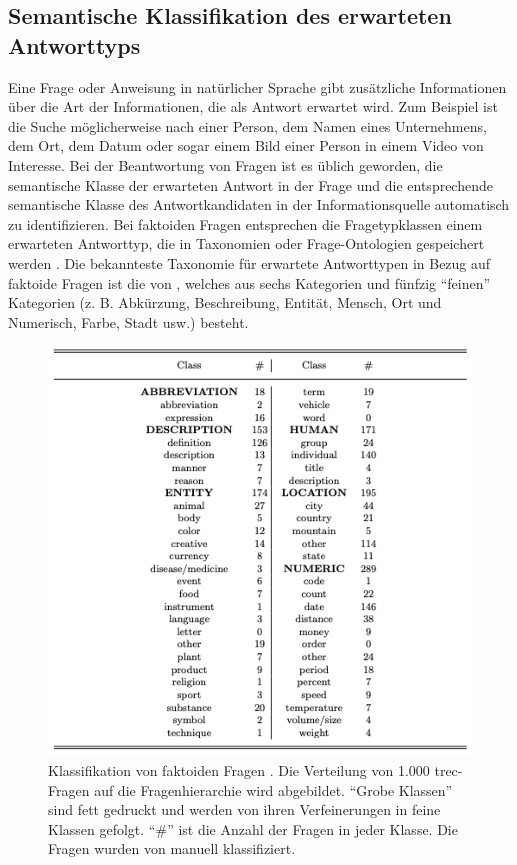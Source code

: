 \documentclass[
        ngerman,
        paper=a4,
        numbers=noendperiod,
]{scrreprt}
\begin{document}
\subsection{Semantische Klassifikation des erwarteten Antworttyps}

Eine Frage oder Anweisung in natürlicher Sprache gibt zusätzliche Informationen über die Art der Informationen, die als Antwort erwartet wird. Zum Beispiel ist die Suche möglicherweise nach einer Person, dem Namen eines Unternehmens, dem Ort, dem Datum oder sogar einem Bild einer Person in einem Video von Interesse. Bei der Beantwortung von Fragen ist es üblich geworden, die semantische Klasse der erwarteten Antwort in der Frage und die entsprechende semantische Klasse des Antwortkandidaten in der Informationsquelle automatisch zu identifizieren. Bei faktoiden Fragen entsprechen die Fragetypklassen einem erwarteten Antworttyp, die in Taxonomien oder Frage-Ontologien gespeichert werden \citep[S. 5420]{Kolomiyets2011APerspective}. 
Die bekannteste Taxonomie für erwartete Antworttypen in Bezug auf faktoide Fragen ist die von \citep{li2006learning}, welches aus sechs Kategorien und fünfzig \enquote{feinen} Kategorien (z. B. Abkürzung, Beschreibung, Entität, Mensch, Ort und Numerisch, Farbe, Stadt usw.) besteht.

\begin{figure}[H]
\centering\includegraphics[width=0.7\linewidth]{images/lir.png}
\caption[Klassifikation von faktoiden Fragen]{Klassifikation von faktoiden Fragen \citep{li2006learning}. Die Verteilung von 1.000 \ac{trec}-Fragen auf die Fragenhierarchie wird abgebildet. \enquote{Grobe Klassen} sind fett gedruckt und werden von ihren Verfeinerungen in feine Klassen gefolgt. \enquote{\#} ist die Anzahl der Fragen in jeder Klasse. Die Fragen wurden von \citep{li2006learning} manuell klassifiziert.}
\label{fig:lir}
\end{figure}
\end{document}
